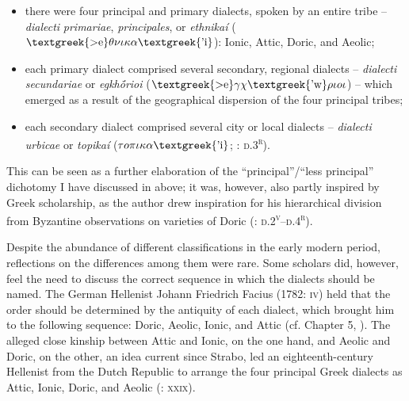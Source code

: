 \begin{itemize}
\item there were four principal and primary dialects, spoken by an entire tribe – \textit{dialecti} \textit{primariae}, \textit{principales}, or \textit{ethnikaí} ($\text{\textgreek{>e}}\theta \nu \iota \kappa \alpha \text{\textgreek{'i}}$): Ionic, Attic, Doric, and Aeolic;

\item each primary dialect comprised several secondary, regional dialects – \textit{dialecti} \textit{secundariae} or \textit{egkhṓrioi} ($\text{\textgreek{>e}}\gamma \chi \text{\textgreek{'w}}\rho \iota o\iota $) – which emerged as a result of the geographical dispersion of the four principal tribes;

\item each secondary dialect comprised several city or local dialects – \textit{dialecti} \textit{urbicae} or \textit{topikaí} ($\tau o\pi \iota \kappa \alpha \text{\textgreek{'i}}$; \citealt{Thryllitsch1709}: \textsc{d.3}\textsc{\textsuperscript{r}}).

\end{itemize}

This can be seen as a further elaboration of the “principal”/“less principal” dichotomy I have discussed in  above; it was, however, also partly inspired by Greek scholarship, as the author drew inspiration for his hierarchical division from Byzantine observations on varieties of Doric (\citealt{Thryllitsch1709}: \textsc{d.2}\textsc{\textsuperscript{v}}\textsc{–d.4}\textsc{\textsuperscript{r}}).

Despite the abundance of different classifications in the early modern period, reflections on the differences among them were rare. Some scholars did, however, feel the need to discuss the correct sequence in which the dialects should be named. The German Hellenist Johann Friedrich Facius (1782: \textsc{iv}) held that the order should be determined by the antiquity of each dialect, which brought him to the following sequence: Doric, Aeolic, Ionic, and Attic (cf. Chapter 5, ). The alleged close kinship between Attic and Ionic, on the one hand, and Aeolic and Doric, on the other, an idea current since Strabo, led an eighteenth-century Hellenist from the Dutch Republic to arrange the four principal Greek dialects as Attic, Ionic, Doric, and Aeolic (\citealt{Koen1766}: \textsc{xxix}).


